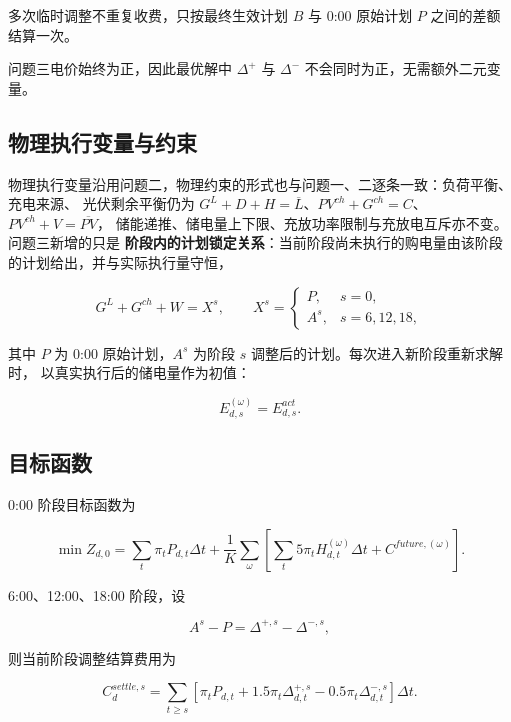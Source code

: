 多次临时调整不重复收费，只按最终生效计划 \(B\) 与 0:00 原始计划 \(P\) 之间的差额结算一次。

问题三电价始终为正，因此最优解中 \(\Delta^+\) 与 \(\Delta^-\) 不会同时为正，无需额外二元变量。

\subsection{物理执行变量与约束}

物理执行变量沿用问题二，物理约束的形式也与问题一、二逐条一致：负荷平衡、充电来源、
光伏剩余平衡仍为 \(G^L+D+H=\overline L\)、\(PV^{ch}+G^{ch}=C\)、\(PV^{ch}+V=\overline{PV}\)，
储能递推、储电量上下限、充放功率限制与充放电互斥亦不变。问题三新增的只是
\textbf{阶段内的计划锁定关系}：当前阶段尚未执行的购电量由该阶段的计划给出，并与实际执行量守恒，

\begin{equation}
G^L+G^{ch}+W=X^s,
\qquad
X^s=
\begin{cases}
P,&s=0,\\
A^s,&s=6,12,18,
\end{cases}
\end{equation}

其中 \(P\) 为 0:00 原始计划，\(A^s\) 为阶段 \(s\) 调整后的计划。每次进入新阶段重新求解时，
以真实执行后的储电量作为初值：

\begin{equation}
E^{(\omega)}_{d,s}=E^{act}_{d,s}.
\end{equation}

\subsection{目标函数}

0:00 阶段目标函数为

\begin{equation}
\min Z_{d,0}
=
\sum_t
\pi_tP_{d,t}\Delta t
+
\frac1K
\sum_{\omega}
\left[
\sum_t
5\pi_tH^{(\omega)}_{d,t}\Delta t
+
C^{future,(\omega)}
\right].
\end{equation}

6:00、12:00、18:00 阶段，设

\[
A^s-P
=
\Delta^{+,s}
-
\Delta^{-,s},
\]

则当前阶段调整结算费用为

\begin{equation}
C^{settle,s}_d
=
\sum_{t\ge s}
\left[
\pi_tP_{d,t}
+
1.5\pi_t\Delta^{+,s}_{d,t}
-
0.5\pi_t\Delta^{-,s}_{d,t}
\right]\Delta t.
\end{equation}

